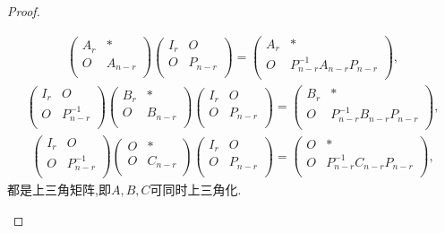 \documentclass[../../main.tex]{subfiles}%
\begin{document}
\begin{proof}
\begin{enumerate}[(1)]
\begin{align*}
\begin{pmatrix}
A_r&		*\\
O&		A_{n-r}\\
\end{pmatrix} \begin{pmatrix}
I_r&		O\\
O&		P_{n-r}\\
\end{pmatrix} =\begin{pmatrix}
A_r&		*\\
O&		P_{n-r}^{-1}A_{n-r}P_{n-r}\\
\end{pmatrix},
\end{align*}
\begin{align*}
\begin{pmatrix}
I_r&		O\\
O&		P_{n-r}^{-1}\\
\end{pmatrix} \begin{pmatrix}
B_r&		*\\
O&		B_{n-r}\\
\end{pmatrix} \begin{pmatrix}
I_r&		O\\
O&		P_{n-r}\\
\end{pmatrix} =\begin{pmatrix}
B_r&		*\\
O&		P_{n-r}^{-1}B_{n-r}P_{n-r}\\
\end{pmatrix},
\end{align*}
\begin{align*}
\begin{pmatrix}
I_r&		O\\
O&		P_{n-r}^{-1}\\
\end{pmatrix} \begin{pmatrix}
O&		*\\
O&		C_{n-r}\\
\end{pmatrix} \begin{pmatrix}
I_r&		O\\
O&		P_{n-r}\\
\end{pmatrix} =\begin{pmatrix}
O&		*\\
O&		P_{n-r}^{-1}C_{n-r}P_{n-r}\\
\end{pmatrix},
\end{align*}
都是上三角矩阵,即$A,B,C$可同时上三角化.
\end{enumerate}
\end{proof}
\end{document}
